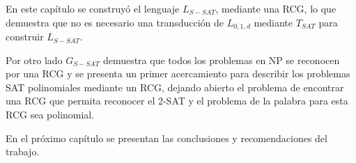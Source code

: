 En este capítulo se construyó el lenguaje $L_{S-SAT}$, mediante una RCG, lo que demuestra que no es necesario una transducción de $L_{0,1,d}$ mediante $T_{SAT}$ para construir $L_{S-SAT}$.

Por otro lado $G_{S-SAT}$ demuestra que todos los problemas en NP se reconocen por una RCG y se presenta un primer acercamiento para describir los problemas SAT polinomiales mediante un RCG, dejando abierto el problema de encontrar una RCG que permita reconocer el 2-SAT y el problema de la palabra para esta RCG sea polinomial.

En el próximo capítulo se presentan las conclusiones y recomendaciones del trabajo.
